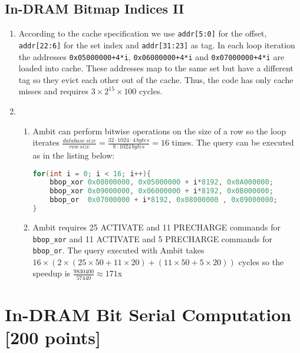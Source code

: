 \documentclass[a4paper]{article}
\begin{document}
\subsection{In-DRAM Bitmap Indices II}

\begin{enumerate}[label=\alph*)]
    \item According to the cache specification we use \verb|addr[5:0]| for the offset,
        \verb|addr[22:6]| for the set index and \verb|addr[31:23]| as tag. In each loop
        iteration the addresses \verb|0x05000000+4*i|, \verb|0x06000000+4*i| and 
        \verb|0x07000000+4*i| are loaded into cache. These addresses map to the same
        set but have a different tag so they evict each other out of the cache. Thus, the
        code has only cache misses and requires $3 \times 2^{15} \times 100$ cycles.

    \item 
        \begin{enumerate}[label=\roman*)]
            \item Ambit can perform bitwise operations on the size of a row so the loop
                iterates 
                $\frac{database \, size}{row \, size} = \frac{32 \cdot 1024 \cdot 4 \, bytes}{8 \cdot 1024 \, bytes} = 16$
                times. The query can be executed as in the listing below:
\begin{lstlisting}[language=c]
for(int i = 0; i < 16; i++){
    bbop_xor 0x08000000, 0x05000000 + i*8192, 0x0A000000;
    bbop_xor 0x09000000, 0x06000000 + i*8192, 0x0B000000;
    bbop_or  0x07000000 + i*8192, 0x08000000 , 0x09000000;
}
\end{lstlisting}

            \item Ambit requires 25 ACTIVATE and 11 PRECHARGE commands for \verb|bbop_xor| and
                11 ACTIVATE and 5 PRECHARGE commands for \verb|bbop_or|. The query executed with
                Ambit takes $16 \times (2 \times (25 \times 50 + 11 \times 20) + (11 \times 50 + 5 \times 20))$
                cycles so the speedup is $\frac{9830400}{57440}\approx 171$x
        \end{enumerate}
\end{enumerate}

\section{In-DRAM Bit Serial Computation [200 points]}
\end{document}

